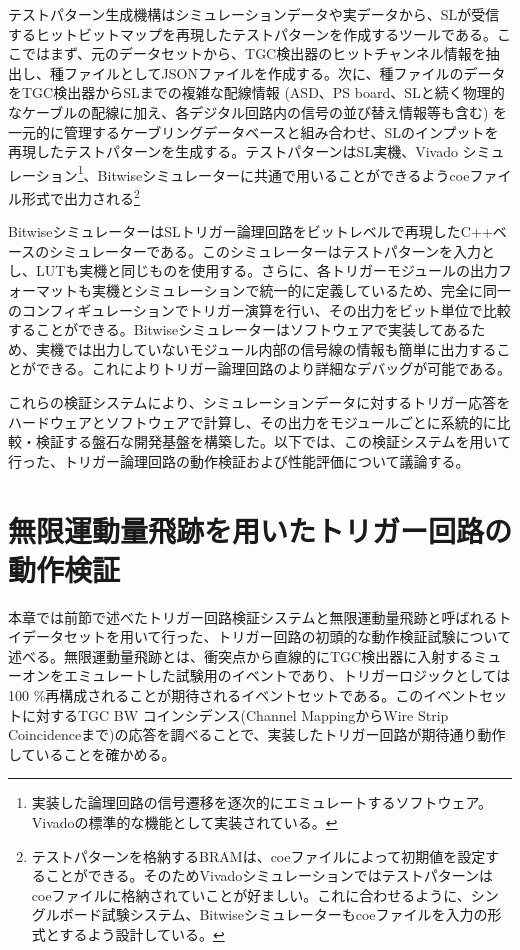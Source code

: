 テストパターン生成機構はシミュレーションデータや実データから、SLが受信するヒットビットマップを再現したテストパターンを作成するツールである。ここではまず、元のデータセットから、TGC検出器のヒットチャンネル情報を抽出し、種ファイルとしてJSONファイルを作成する。次に、種ファイルのデータをTGC検出器からSLまでの複雑な配線情報 (ASD、PS board、SLと続く物理的なケーブルの配線に加え、各デジタル回路内の信号の並び替え情報等も含む) を一元的に管理するケーブリングデータベースと組み合わせ、SLのインプットを再現したテストパターンを生成する。テストパターンはSL実機、Vivado シミュレーション\footnote{実装した論理回路の信号遷移を逐次的にエミュレートするソフトウェア。Vivadoの標準的な機能として実装されている。}、Bitwiseシミュレーターに共通で用いることができるようcoeファイル形式で出力される\footnote{テストパターンを格納するBRAMは、coeファイルによって初期値を設定することができる。そのためVivadoシミュレーションではテストパターンはcoeファイルに格納されていことが好ましい。これに合わせるように、シングルボード試験システム、Bitwiseシミュレーターもcoeファイルを入力の形式とするよう設計している。}

BitwiseシミュレーターはSLトリガー論理回路をビットレベルで再現したC++ベースのシミュレーターである。このシミュレーターはテストパターンを入力とし、LUTも実機と同じものを使用する。さらに、各トリガーモジュールの出力フォーマットも実機とシミュレーションで統一的に定義しているため、完全に同一のコンフィギュレーションでトリガー演算を行い、その出力をビット単位で比較することができる。Bitwiseシミュレーターはソフトウェアで実装してあるため、実機では出力していないモジュール内部の信号線の情報も簡単に出力することができる。これによりトリガー論理回路のより詳細なデバッグが可能である。

これらの検証システムにより、シミュレーションデータに対するトリガー応答をハードウェアとソフトウェアで計算し、その出力をモジュールごとに系統的に比較・検証する盤石な開発基盤を構築した。以下では、この検証システムを用いて行った、トリガー論理回路の動作検証および性能評価について議論する。




\section{無限運動量飛跡を用いたトリガー回路の動作検証}
\label{sec_IMT}

本章では前節で述べたトリガー回路検証システムと無限運動量飛跡と呼ばれるトイデータセットを用いて行った、トリガー回路の初頭的な動作検証試験について述べる。無限運動量飛跡とは、衝突点から直線的にTGC検出器に入射するミューオンをエミュレートした試験用のイベントであり、トリガーロジックとしては100 \%再構成されることが期待されるイベントセットである。このイベントセットに対するTGC BW コインシデンス(Channel MappingからWire Strip Coincidenceまで)の応答を調べることで、実装したトリガー回路が期待通り動作していることを確かめる。

